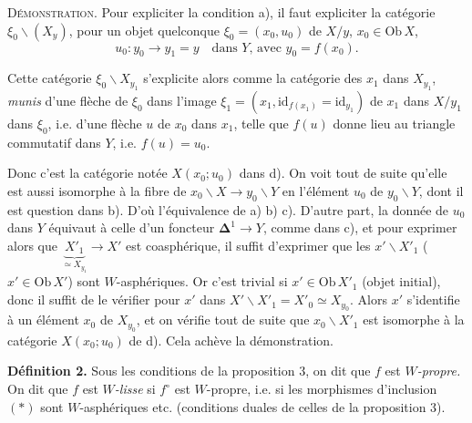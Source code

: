 \documentclass[11pt,leqno]{article}
\newcommand{\printedpage}[1]{\marginpar{\footnotesize p.~#1}}
\newcommand{\msp}[1]{\marginpar{\footnotesize [#1]}}
\newcommand{\Ob}{\mathrm{Ob}\,}
\begin{document}
\msp{page 27}\textsc{Démonstration.} Pour expliciter la condition a), il faut expliciter la catégorie $\xi_0\backslash(X_y)$, pour un objet quelconque $\xi_0 = (x_0, u_0)$ de $X/y$, $x_0 \in \Ob X$,
\[
u_0 : y_0 \longrightarrow y_1 = y \quad \text{dans $Y$, avec $y_0 = f(x_0)$.}
\]

Cette catégorie $\xi_0\backslash X_{y_1}$ s'explicite alors comme la catégorie des $x_1$ dans $X_{y_1}$, \textit{munis} d'une flèche de $\xi_0$ dans l'image $\xi_1 = (x_1, \mathrm{id}_{f(x_1)} = \mathrm{id}_{y_1})$ de $x_1$ dans $X/y_1$ dans $\xi_0$, i.e. d'une flèche $u$ de $x_0$ dans $x_1$, telle que $f(u)$ donne lieu au triangle commutatif dans $Y$, i.e. $f(u) = u_0$. %

\begin{center}
\end{center}

Donc c'est la catégorie notée $X(x_0;u_0)$ dans d). On voit tout de suite qu'elle est aussi isomorphe à la fibre de $x_0\backslash X \longrightarrow y_0\backslash Y$ en l'élément $u_0$ de $y_0\backslash Y$, dont il est question dans b). D'où l'équivalence de a) b) c). D'autre part, la donnée de $u_0$ dans $Y$ équivaut à celle d'un foncteur $\mathbf{\Delta}^1 \longrightarrow Y$, comme dans c), et pour exprimer alors que $\underbrace{X'_1}_{\simeq X_{y_1}} \longrightarrow X'$ est coasphérique, il suffit d'exprimer que les $x'\backslash X'_1$ ($x' \in \Ob X'$) sont $W$-asphériques. Or c'est trivial si $x' \in \Ob X'_1$ (objet initial), donc il suffit de le vérifier pour $x'$ dans $X'\backslash X'_1 = X'_0 \simeq X_{y_0}$. Alors $x'$ s'identifie à un élément $x_0$ de $X_{y_0}$, et on vérifie tout de suite que $x_0\backslash X'_1$ est isomorphe à la catégorie $X(x_0;u_0)$ de d). Cela achève la démonstration.

\printedpage{23}

\msp{page 28}\textbf{Définition 2.} Sous les conditions de la proposition 3, on dit que $f$ est \textit{$W$-propre.} On dit que $f$ est \textit{$W$-lisse} si $f^{\circ}$ est $W$-propre, i.e. si les morphismes d'inclusion $(*)$ sont $W$-asphériques etc. (conditions duales de celles de la proposition 3).
\end{document}
